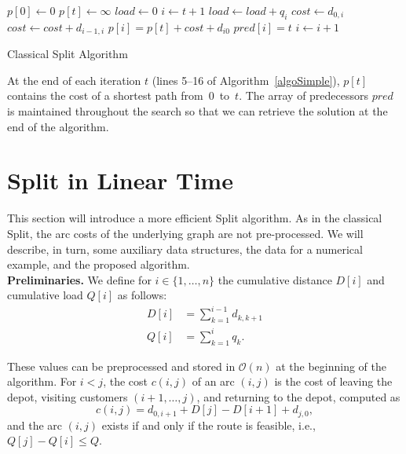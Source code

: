 \documentclass[11pt]{article}
\newcommand{\cO}{{\mathcal O}}
\newcommand{\blue}[1]{{#1}}
\begin{document}
\begin{algorithm}[htbp]
$p[0] \gets 0$ \;
{
	$p[t] \gets \infty$ \;
}
{ 
	$load \gets 0$ \;
	$i \gets t+1$ \;
	{ 
		$load \gets load + q_i$ \;
		{
			$cost \gets d_{0,i}$ \;
		}
		\Else
		{
			$cost \gets cost + d_{i-1,i}$ \;
		}
		{
			$p[i] = p[t] + cost + d_{i0}$ \;
            	        $pred[i] = t$ \;
		}
		$i \gets i+1$ \;
	}
}
\caption{Classical Split Algorithm} 
\label{algoSimple} 
\end{algorithm}

At the end of each iteration $t$ (lines 5--16 of Algorithm~\ref{algoSimple}), $p[t]$ contains the cost of a shortest path from~$0$~to~$t$. The array of predecessors $pred$ is maintained throughout the search so that we can retrieve the solution at the end of the algorithm.

\section{Split in Linear Time}
\label{sectionLinear}

This section will introduce a more efficient Split algorithm.
\blue{As in the classical Split, the arc costs of the underlying graph are not pre-processed.
We will describe, in turn, some auxiliary data structures, the data for a numerical example, and the proposed algorithm}. \\

\noindent
\textbf{Preliminaries.} We define for $i \in \{1,\dots,n\}$ the cumulative distance $D[i]$ and cumulative load $Q[i]$ as follows:
\begin{align}
D[i] &=  \sum_{k=1}^{i-1} d_{k,k+1} \label{cumulativeDistance} \\
Q[i] &= \sum_{k=1}^{i} q_k.   \label{cumulativeLoad}
\end{align}

These values can be preprocessed and stored in $\cO(n)$ at the beginning of the algorithm.
For $i < j$, the cost $c(i,j)$ of an arc $(i,j)$ is the cost of leaving the depot, visiting customers $(i+1,\dots,j)$, and returning to the depot, computed as
\begin{equation}
c(i,j) = d_{0,i+1} + D[j] - D[i+1] + d_{j,0},
\end{equation}
and the arc $(i,j)$ exists if and only if the route is feasible, i.e., $Q[j]-Q[i] \leq Q$. \\
\end{document}
